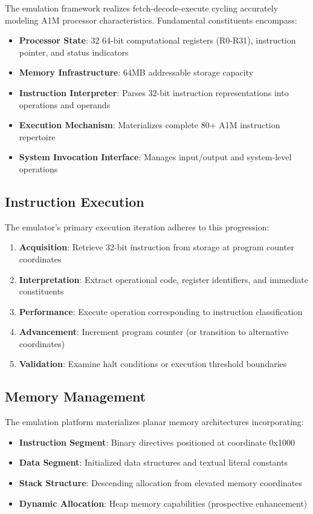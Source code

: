 \documentclass[conference,10pt,twocolumn]{IEEEtran}
\begin{document}
The emulation framework realizes fetch-decode-execute cycling accurately modeling A1M processor characteristics. Fundamental constituents encompass:

\begin{itemize}
\item \textbf{Processor State}: 32 64-bit computational registers (R0-R31), instruction pointer, and status indicators
\item \textbf{Memory Infrastructure}: 64MB addressable storage capacity
\item \textbf{Instruction Interpreter}: Parses 32-bit instruction representations into operations and operands
\item \textbf{Execution Mechanism}: Materializes complete 80+ A1M instruction repertoire
\item \textbf{System Invocation Interface}: Manages input/output and system-level operations
\end{itemize}

\subsection{Instruction Execution}

The emulator's primary execution iteration adheres to this progression:

\begin{enumerate}
\item \textbf{Acquisition}: Retrieve 32-bit instruction from storage at program counter coordinates
\item \textbf{Interpretation}: Extract operational code, register identifiers, and immediate constituents
\item \textbf{Performance}: Execute operation corresponding to instruction classification
\item \textbf{Advancement}: Increment program counter (or transition to alternative coordinates)
\item \textbf{Validation}: Examine halt conditions or execution threshold boundaries
\end{enumerate}

\subsection{Memory Management}

The emulation platform materializes planar memory architectures incorporating:

\begin{itemize}
\item \textbf{Instruction Segment}: Binary directives positioned at coordinate 0x1000
\item \textbf{Data Segment}: Initialized data structures and textual literal constants
\item \textbf{Stack Structure}: Descending allocation from elevated memory coordinates
\item \textbf{Dynamic Allocation}: Heap memory capabilities (prospective enhancement)
\end{itemize}
\end{document}

